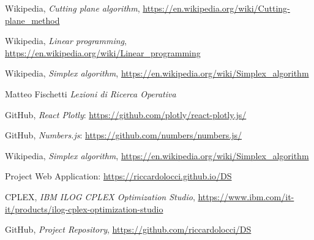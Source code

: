 \documentclass[9pt]{extarticle}
\begin{document}
    \begin{thebibliography}{7}

        Wikipedia,
        \textit{Cutting plane algorithm},
        \url{https://en.wikipedia.org/wiki/Cutting-plane_method}

        Wikipedia,
        \textit{Linear programming},
        \url{https://en.wikipedia.org/wiki/Linear_programming}

        Wikipedia,
        \textit{Simplex algorithm},
        \url{https://en.wikipedia.org/wiki/Simplex_algorithm}
        
        Matteo Fischetti
        \textit{ Lezioni di Ricerca Operativa }

        GitHub,
        \textit{React Plotly}:
        \url{https://github.com/plotly/react-plotly.js/}

        GitHub,
        \textit{Numbers.js}:
        \url{https://github.com/numbers/numbers.js/}

        Wikipedia,
        \textit{Simplex algorithm},
        \url{https://en.wikipedia.org/wiki/Simplex_algorithm}

        Project Web Application: 
        \url{https://riccardolocci.github.io/DS}
        
        CPLEX,
        \textit{IBM ILOG CPLEX Optimization Studio},
        \url{https://www.ibm.com/it-it/products/ilog-cplex-optimization-studio}

        GitHub,
        \textit{Project Repository},
        \url{https://github.com/riccardolocci/DS}

    \end{thebibliography}
\end{document}

